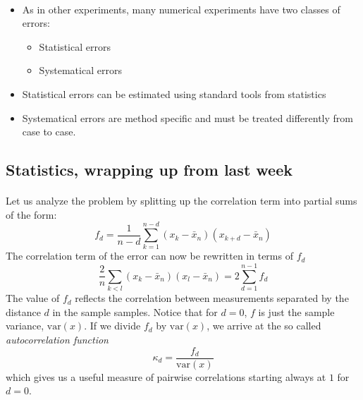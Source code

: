 \documentclass[%
oneside,                 %
final,                   %
10pt]{article}
\begin{document}
\paragraph{}
\begin{itemize}
    \item As in other experiments, many numerical  experiments have two classes of errors:
\begin{itemize}

      \item Statistical errors

      \item Systematical errors

\end{itemize}

\noindent
    \item Statistical errors can be estimated using standard tools from statistics

    \item Systematical errors are method specific and must be treated differently from case to case. 
\end{itemize}

\noindent

    

\subsection*{Statistics, wrapping up from last week}

\paragraph{}
Let us analyze the problem by splitting up the correlation term into
partial sums of the form:
\[
f_d = \frac{1}{n-d}\sum_{k=1}^{n-d}(x_k - \bar x_n)(x_{k+d} - \bar x_n)
\]
The correlation term of the error can now be rewritten in terms of
$f_d$
\[
\frac{2}{n}\sum_{k<l} (x_k - \bar x_n)(x_l - \bar x_n) =
2\sum_{d=1}^{n-1} f_d
\]
The value of $f_d$ reflects the correlation between measurements
separated by the distance $d$ in the sample samples.  Notice that for
$d=0$, $f$ is just the sample variance, $\mathrm{var}(x)$. If we divide $f_d$
by $\mathrm{var}(x)$, we arrive at the so called \emph{autocorrelation function}
\[
\kappa_d = \frac{f_d}{\mathrm{var}(x)}
\]
which gives us a useful measure of pairwise correlations
starting always at $1$ for $d=0$.
\end{document}
